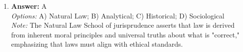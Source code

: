 \documentclass[12pt]{article}
\begin{document}
\begin{enumerate}[label=\arabic*.]
\\ \textit{Note:} The statement that "the law is too complex to be codified" effectively refutes Bentham's argument because it highlights the inherent intricacies and nuances of legal systems that may resist simplification into a single code, suggesting that codification could lead to oversimplification and misinterpretation of the law.
\item \textbf{Answer:} A
\\ \textit{Options:} A) Natural Law; B) Analytical; C) Historical; D) Sociological
\\ \textit{Note:} The Natural Law School of jurisprudence asserts that law is derived from inherent moral principles and universal truths about what is "correct," emphasizing that laws must align with ethical standards.
\end{enumerate}
\end{document}
